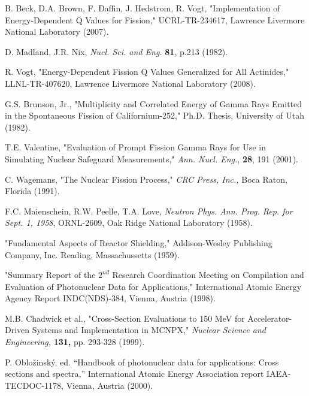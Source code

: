  B. Beck, D.A. Brown, F. Daffin, J. Hedstrom, 
R. Vogt, "Implementation of Energy-Dependent Q Values for Fission,"
UCRL-TR-234617, Lawrence Livermore National Laboratory (2007).  

 D. Madland, J.R. Nix, \textit{Nucl. Sci. and
Eng.} \textbf{81}, p.213 (1982).

 R. Vogt, "Energy-Dependent Fission Q Values 
Generalized for All Actinides," LLNL-TR-407620, Lawrence Livermore 
National Laboratory (2008).  

 G.S. Brunson, Jr., "Multiplicity and
Correlated Energy of Gamma Rays Emitted in the Spontaneous Fission of
Californium-252," Ph.D. Thesis, University of Utah (1982).

 T.E. Valentine, "Evaluation of Prompt Fission
Gamma Rays for Use in Simulating Nuclear Safeguard Measurements,"
\textit{Ann. Nucl. Eng.}, \textbf{28}, 191 (2001).  

 C. Wagemans, "The Nuclear Fission Process," \textit{CRC Press,
Inc.,} Boca Raton, Florida (1991).  

F.C. Maienschein, R.W. Peelle, T.A. Love, \textit{Neutron
Phys. Ann. Prog. Rep. for Sept. 1, 1958}, ORNL-2609, Oak Ridge
National Laboratory (1958).  

 "Fundamental
Aspects of Reactor Shielding," Addison-Wesley Publishing Company,
Inc. Reading, Massachussetts (1959).

 "Summary Report of the $2^{nd}$ Research Coordination 
Meeting on Compilation and Evaluation of Photonuclear Data for 
Applications," International Atomic Energy Agency Report INDC(NDS)-384, 
Vienna, Austria (1998).


 M.B. Chadwick et al., "Cross-Section Evaluations to 
150 MeV for Accelerator-Driven Systems and Implementation in MCNPX," 
\textit{Nuclear Science and Engineering,} \textbf{131,} pp. 293-328 (1999).

 P. Oblo{\v z}insk{\' y}, ed. ``Handbook of photonuclear data for applications: Cross sections and spectra,'' International Atomic Energy Association report IAEA-TECDOC-1178, Vienna, Austria (2000).


